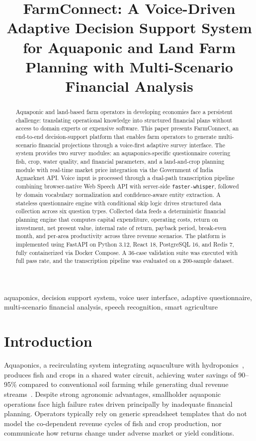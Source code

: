 \documentclass[conference]{IEEEtran}
\title{FarmConnect: A Voice-Driven Adaptive Decision Support System
for Aquaponic and Land Farm Planning with Multi-Scenario
Financial Analysis}
\author{
  \IEEEauthorblockN{Chandan K}
  \IEEEauthorblockA{
    \textit{Student}\\
    \textit{Department of MCA}\\
    \textit{RV College of Engineering}\\
    Bengaluru, Karnataka, India\\
    chandank.mca24@rvce.edu.in
  }
  \and
  \IEEEauthorblockN{Deepika K}
  \IEEEauthorblockA{
    \textit{Associate Professor}\\       
    \textit{Department of MCA}\\
    \textit{RV College of Engineering}\\
    Bengaluru, Karnataka, India\\
    deepikak@rvce.edu.in
  }
}
\begin{document}
\maketitle

\begin{abstract}
Aquaponic and land-based farm operators in developing economies face a
persistent challenge: translating operational knowledge into structured
financial plans without access to domain experts or expensive software.
This paper presents FarmConnect, an end-to-end decision-support platform
that enables farm operators to generate multi-scenario financial projections
through a voice-first adaptive survey interface. The system provides two
survey modules: an aquaponics-specific questionnaire covering fish, crop,
water quality, and financial parameters, and a land-and-crop planning
module with real-time market price integration via the Government of India
Agmarknet API. Voice input is processed through a dual-path transcription
pipeline combining browser-native Web Speech API with server-side
\texttt{faster-whisper}, followed by domain vocabulary normalization and
confidence-aware entity extraction. A stateless questionnaire engine with
conditional skip logic drives structured data collection across six question
types. Collected data feeds a deterministic financial planning engine that
computes capital expenditure, operating costs, return on investment, net
present value, internal rate of return, payback period, break-even month,
and per-area productivity across three revenue scenarios. The platform is
implemented using FastAPI on Python 3.12, React 18, PostgreSQL 16, and
Redis 7, fully containerized via Docker Compose. A 36-case validation suite was executed with full pass rate, and the transcription pipeline was evaluated on a 200-sample dataset.
\end{abstract}

\begin{IEEEkeywords}
aquaponics, decision support system, voice user interface,
adaptive questionnaire, multi-scenario financial analysis,
speech recognition, smart agriculture
\end{IEEEkeywords}

\section{Introduction}
\label{sec:intro}
Aquaponics, a recirculating system integrating aquaculture with
hydroponics~\cite{ref1}, produces fish and crops in a shared water circuit,
achieving water savings of 90--95\% compared to conventional soil
farming while generating dual revenue streams~\cite{ref7}. Despite
strong agronomic advantages, smallholder aquaponic operations face high
failure rates driven principally by inadequate financial planning.
Operators typically rely on generic spreadsheet templates that do not
model the co-dependent revenue cycles of fish and crop production, nor
communicate how returns change under adverse market or yield conditions.
\end{document}
